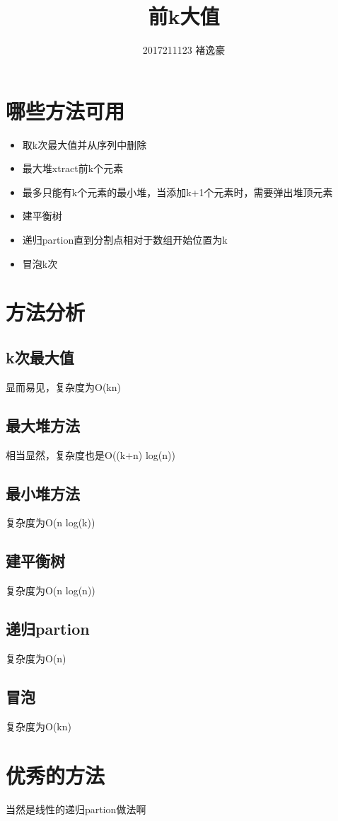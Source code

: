 \documentclass[UTF8]{ctexart}
\title{前k大值}
\author{2017211123 褚逸豪}
\begin{document}
    \maketitle
    \section{哪些方法可用}
    \begin{itemize}
        \item 取k次最大值并从序列中删除\\
        \item 最大堆xtract前k个元素\\
        \item 最多只能有k个元素的最小堆，当添加k+1个元素时，需要弹出堆顶元素\\
        \item 建平衡树\\
        \item 递归partion直到分割点相对于数组开始位置为k\\
        \item 冒泡k次
    \end{itemize}
    \section{方法分析}
    \subsection{k次最大值}
    显而易见，复杂度为O(kn)
    \subsection{最大堆方法}
    相当显然，复杂度也是O((k+n) log(n))
    \subsection{最小堆方法}
    复杂度为O(n log(k))
    \subsection{建平衡树}
    复杂度为O(n log(n))
    \subsection{递归partion}
    复杂度为O(n)
    \subsection{冒泡}
    复杂度为O(kn)
    \section{优秀的方法}
    当然是线性的递归partion做法啊
\end{document}
